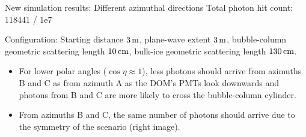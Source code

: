 \begin{frame}[fragile]{New simulation results: Different azimuthal directions}
  \tiny Total photon hit count: 118441 / 1e7

  \tiny Configuration: Starting distance $3\text{\,m}$, plane-wave extent $3\text{\,m}$, bubble-column geometric scattering length $10\text{\,cm}$, bulk-ice geometric scattering length $130\text{\,cm}$.
  \normalsize

  \begin{itemize}
    \item For lower polar angles ($\cos\eta \approx 1$), less photons should arrive from azimuths B and C as from azimuth A
      \tiny as the DOM's PMTs look downwards and photons from B and C are more likely to cross the bubble-column cylinder. \normalsize \checkmark
    \item From azimuths B and C, the same number of photons should arrive \tiny due to the symmetry of the scenario (right image). \normalsize \checkmark
  \end{itemize}
\end{frame}

